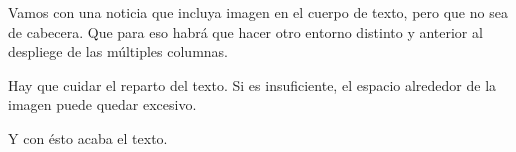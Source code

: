 Vamos con una noticia que incluya imagen en el cuerpo de texto, pero que no sea de cabecera. Que para eso habrá que hacer otro entorno distinto y anterior al despliege de las múltiples columnas.


Hay que cuidar el reparto del texto. Si es insuficiente, el espacio alrededor de la imagen puede quedar excesivo.

\lipsum[1]

Y con ésto acaba el texto.